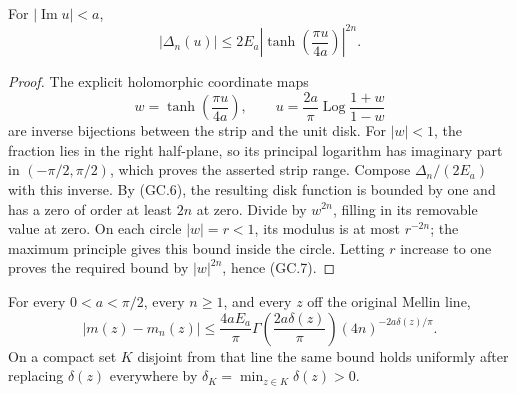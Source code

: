 \begin{lemma}
For \(|\operatorname{Im}u|<a\),
\[
 |\Delta_n(u)|\leq2E_a
   \left|\tanh\!\left(\frac{\pi u}{4a}\right)\right|^{2n}.
                                                        \tag{GC.7}
\]
\end{lemma}

\begin{proof}
The explicit holomorphic coordinate maps
\[
 w=\tanh\!\left(\frac{\pi u}{4a}\right),\qquad
 u=\frac{2a}{\pi}\operatorname{Log}\frac{1+w}{1-w}
\]
are inverse bijections between the strip and the unit disk.  For
\(|w|<1\), the fraction lies in the right half-plane, so its
principal logarithm has imaginary part in \((-\pi/2,\pi/2)\),
which proves the asserted strip range.  Compose \(\Delta_n/(2E_a)\)
with this inverse.  By (GC.6), the resulting disk function is bounded
by one and has a zero of order at least \(2n\) at zero.  Divide by
\(w^{2n}\), filling in its removable value at zero.  On each circle
\(|w|=r<1\), its modulus is at most \(r^{-2n}\); the maximum
principle gives this bound inside the circle.  Letting \(r\) increase
to one proves the required bound by \(|w|^{2n}\), hence (GC.7).
\end{proof}

\begin{theorem}
\label{thm:gaussian-resolvent-rate}
For every \(0<a<\pi/2\), every \(n\geq1\), and every
\(z\) off the original Mellin line,
\[
 \boxed{\displaystyle
 |m(z)-m_n(z)|\leq\frac{4aE_a}{\pi}
     \Gamma\!\left(\frac{2a\delta(z)}{\pi}\right)
                 (4n)^{-2a\delta(z)/\pi}.}              \tag{GC.8}
\]
On a compact set \(K\) disjoint from that line the same bound holds
uniformly after replacing \(\delta(z)\) everywhere by
\(\delta_K=\min_{z\in K}\delta(z)>0\).
\end{theorem}

